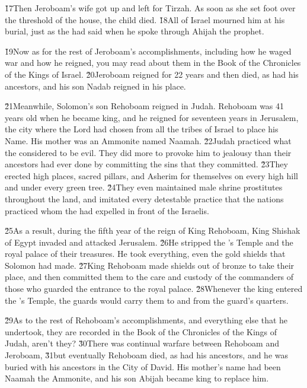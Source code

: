 \v{17}Then Jeroboam's wife got up and left for Tirzah. As soon as she set foot over the threshold of the house, the child died. \v{18}All of Israel mourned him at his burial, just as the  had said when he spoke through Ahijah the prophet.

\v{19}Now as for the rest of Jeroboam's accomplishments, including how he waged war and how he reigned, you may read about them in the Book of the Chronicles of the Kings of Israel. \v{20}Jeroboam reigned for 22 years and then died, as had his ancestors, and his son Nadab reigned in his place.

\v{21}Meanwhile, Solomon's son Rehoboam reigned in Judah. Rehoboam was 41 years old when he became king, and he reigned for seventeen years in Jerusalem, the city where the Lord had chosen from all the tribes of Israel to place his Name. His mother was an Ammonite named Naamah. \v{22}Judah practiced what the  considered to be evil. They did more to provoke him to jealousy than their ancestors had ever done by committing the sins that they committed. \v{23}They erected high places, sacred pillars, and Asherim for themselves on every high hill and under every green tree. \v{24}They even maintained male shrine prostitutes throughout the land, and imitated every detestable practice that the nations practiced whom the  had expelled in front of the Israelis.

\v{25}As a result, during the fifth year of the reign of King Rehoboam, King Shishak of Egypt invaded and attacked Jerusalem. \v{26}He stripped the 's Temple and the royal palace of their treasures. He took everything, even the gold shields that Solomon had made. \v{27}King Rehoboam made shields out of bronze to take their place, and then committed them to the care and custody of the commanders of those who guarded the entrance to the royal palace. \v{28}Whenever the king entered the 's Temple, the guards would carry them to and from the guard's quarters.

\v{29}As to the rest of Rehoboam's accomplishments, and everything else that he undertook, they are recorded in the Book of the Chronicles of the Kings of Judah, aren't they? \v{30}There was continual warfare between Rehoboam and Jeroboam, \v{31}but eventually Rehoboam died, as had his ancestors, and he was buried with his ancestors in the City of David. His mother's name had been Naamah the Ammonite, and his son Abijah became king to replace him.

